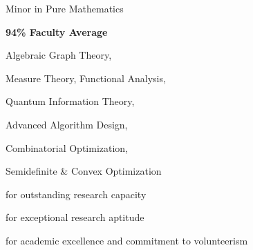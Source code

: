 \documentclass[11pt,a4paper]{altacv}
\begin{document}
\begin{paracol}{2}
\smallskip

Minor in Pure Mathematics

\smallskip

\textbf{94\% Faculty Average}

Algebraic Graph Theory,

Measure Theory, Functional Analysis,

Quantum Information Theory,

Advanced Algorithm Design,

Combinatorial Optimization,

Semidefinite \& Convex Optimization


for outstanding research capacity

\divider\smallskip

for exceptional research aptitude

\divider\smallskip

for academic excellence and commitment to volunteerism

\divider\smallskip


\iffalse
\divider\smallskip

\cvevent{President's Scholarship of Distinction}{University of Waterloo}{September 2017}{}
for entrance average above 95\%
\fi

\end{paracol}
\end{document}
